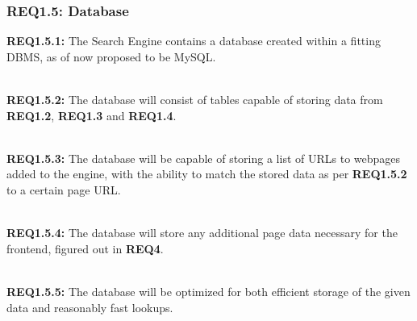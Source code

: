 \subsubsection{REQ1.5: Database}

\textbf{REQ1.5.1:} The Search Engine contains a database created within a fitting DBMS, as of now proposed to be MySQL.\par

\textbf{\\REQ1.5.2:} The database will consist of tables capable of storing data from \textbf{REQ1.2}, \textbf{REQ1.3} and \textbf{REQ1.4}.\par

\textbf{\\REQ1.5.3:} The database will be capable of storing a list of URLs to webpages added to the engine, with the ability to match the stored data as per \textbf{REQ1.5.2} to a certain page URL.\par

\textbf{\\REQ1.5.4:} The database will store any additional page data necessary for the frontend, figured out in \textbf{REQ4}.\par

\textbf{\\REQ1.5.5:} The database will be optimized for both efficient storage of the given data and reasonably fast lookups.\par

